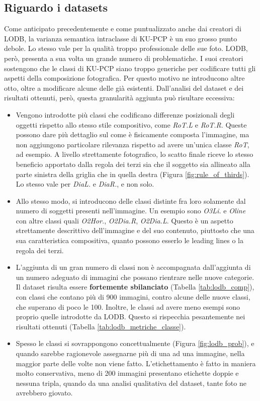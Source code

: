 \subsection{Riguardo i datasets}
Come anticipato precedentemente e come puntualizzato anche dai creatori di LODB, la varianza semantica intraclasse di KU-PCP è un suo grosso punto debole. Lo stesso vale per la qualità troppo professionale delle sue foto. LODB, però, presenta a sua volta un grande numero di problematiche. I suoi creatori sostengono che le classi di KU-PCP siano troppo generiche per codificare tutti gli aspetti della composizione fotografica. Per questo motivo ne introducono altre otto, oltre a modificare alcune delle già esistenti. Dall'analisi del dataset e dei risultati ottenuti, però, questa granularità aggiunta può risultare eccessiva:
\begin{itemize}
    \item Vengono introdotte più classi che codificano differenze posizionali degli oggetti rispetto allo stesso stile compositivo, come \textit{RoT.L} e \textit{RoT.R}. Queste possono dare più dettaglio sul come è fisicamente composta l'immagine, ma non aggiungono particolare rilevanza rispetto ad avere un'unica classe \textit{RoT}, ad esempio. A livello strettamente fotografico, lo scatto finale riceve lo stesso beneficio apportato dalla regola dei terzi sia che il soggetto sia allineato alla parte sinistra della griglia che in quella destra (Figura \ref{fig:rule_of_thirds}). Lo stesso vale per \textit{DiaL.} e \textit{DiaR.}, e non solo.
    
    \item Allo stesso modo, si introducono delle classi distinte fra loro solamente dal numero di soggetti presenti nell'immagine. Un esempio sono \textit{O3Li.} e \textit{Oline} con altre classi quali \textit{O2Hor.}, \textit{O2Dia.R}, \textit{O2Dia.L}. Questo è un aspetto strettamente descrittivo dell'immagine e del suo contenuto, piuttosto che una sua caratteristica compositiva, quanto possono esserlo le leading lines o la regola dei terzi.
    
    \item L'aggiunta di un gran numero di classi non è accompagnata dall'aggiunta di un numero adeguato di immagini che possano rientrare nelle nuove categorie. Il dataset risulta essere \textbf{fortemente sbilanciato} (Tabella \ref{tab:lodb_comp}), con classi che contano più di 900 immagini, contro alcune delle nuove classi, che superano di poco le 100. Inoltre, le classi ad avere meno esempi sono proprio quelle introdotte da LODB. Questo si rispecchia pesantemente nei risultati ottenuti (Tabella \ref{tab:lodb_metriche_classe}).
    
    \item Spesso le classi si sovrappongono concettualmente (Figura \ref{fig:lodb_prob}), e quando sarebbe ragionevole assegnarne più di una ad una immagine, nella maggior parte delle volte non viene fatto. L'etichettamento è fatto in maniera molto conservativa, meno di 200 immagini presentano etichette doppie e nessuna tripla, quando da una analisi qualitativa del dataset, tante foto ne avrebbero giovato.
\end{itemize}

